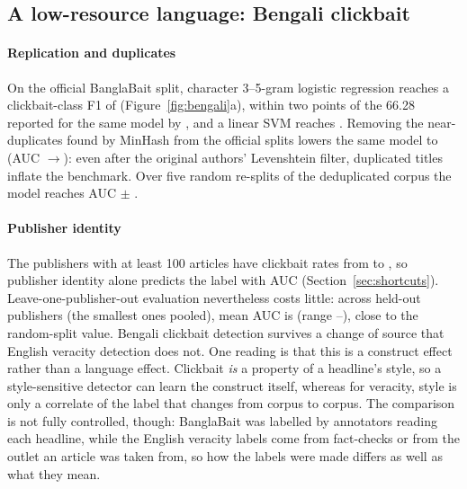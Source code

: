 \subsection{A low-resource language: Bengali clickbait}\label{sec:bangla}
\paragraph{Replication and duplicates}
On the official BanglaBait split, character 3--5-gram logistic regression reaches a clickbait-class F1 of \BBrelFone{} (Figure~\ref{fig:bengali}a), within two points of the 66.28 reported for the same model by \citet{mahtab2023banglabait}, and a linear SVM reaches \BBrelSVMFone{}. Removing the near-duplicates found by MinHash from the official splits lowers the same model to \BBdedFone{} (AUC \BBrelAUC{}$\to$\BBdedAUC{}): even after the original authors' Levenshtein filter, duplicated titles inflate the benchmark. Over five random re-splits of the deduplicated corpus the model reaches AUC \BBseedAUC{} $\pm$ \BBseedAUCsd{}.

\paragraph{Publisher identity}
The \BBnPub{} publishers with at least 100 articles have clickbait rates from \BBrateMin{} to \BBrateMax{}, so publisher identity alone predicts the label with AUC \BBgroupAUC{} (Section~\ref{sec:shortcuts}). Leave-one-publisher-out evaluation nevertheless costs little: across \BBlosoN{} held-out publishers (the smallest ones pooled), mean AUC is \BBlosoAUC{} (range \BBlosoMin--\BBlosoMax), close to the random-split value. Bengali clickbait detection survives a change of source that English veracity detection does not. One reading is that this is a construct effect rather than a language effect. Clickbait \emph{is} a property of a headline's style, so a style-sensitive detector can learn the construct itself, whereas for veracity, style is only a correlate of the label that changes from corpus to corpus. The comparison is not fully controlled, though: BanglaBait was labelled by annotators reading each headline, while the English veracity labels come from fact-checks or from the outlet an article was taken from, so how the labels were made differs as well as what they mean.

